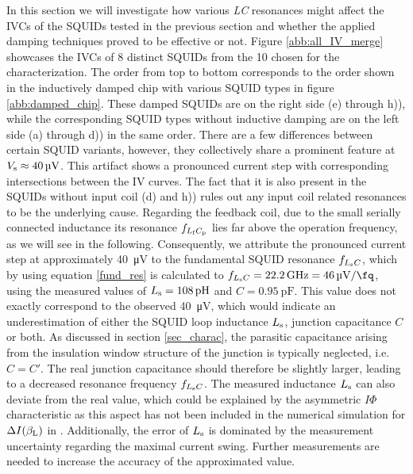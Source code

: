In this section we will investigate how various \textit{LC} resonances might affect the IVCs of the SQUIDs tested in the previous section and whether the applied damping techniques proved to be effective or not. Figure \ref{abb:all_IV_merge} showcases the IVCs of 8 distinct SQUIDs from the 10 chosen for the characterization. The order from top to bottom corresponds to the order shown in the inductively damped chip with various SQUID types in figure \ref{abb:damped_chip}. These damped SQUIDs are on the right side (e) through h)), while the corresponding SQUID types without inductive damping are on the left side (a) through d)) in the same order. There are a few differences between certain SQUID variants, however, they collectively share a prominent feature at $V_{\rm s}\approx\qty{40}{\uV}$. This artifact shows a pronounced current step with corresponding intersections between the IV curves. The fact that it is also present in the SQUIDs without input coil (d) and h)) rules out any input coil related resonances to be the underlying cause. Regarding the feedback coil, due to the small serially connected inductance its resonance $f_{L_{\rm f}C_{\rm p}}$ lies far above the operation frequency, as we will see in the following. Consequently, we attribute the pronounced current step at approximately \qty{40}{\uV} to the fundamental SQUID resonance $f_{L_{\rm s}C}$, which by using equation \ref{fund_res} is calculated to $f_{L_{\rm s}C}=\qty{22.2}{\GHz}=\qty{46}{\uV\per\fq}$, using the measured values of $L_{\rm s}=\qty{108}{\pH}$ and $C=\qty{0.95}{\pF}$. This value does not exactly correspond to the observed \qty{40}{\uV}, which would indicate an underestimation of either the SQUID loop inductance $L_{\rm s}$, junction capacitance $C$ or both. As discussed in section \ref{sec_charac}, the parasitic capacitance arising from the insulation window structure of the junction is typically neglected, i.e. $C=C'$. The real junction capacitance should therefore be slightly larger, leading to a decreased resonance frequency $f_{L_{\rm s}C}$. The measured inductance $L_{\rm s}$ can also deviate from the real value, which could be explained by the asymmetric $I\Phi$ characteristic as this aspect has not been included in the numerical simulation for $\Delta I(\beta_{\rm L})$ in \cite{Tesche1977}. Additionally, the error of $L_{\rm s}$ is dominated by the measurement uncertainty regarding the maximal current swing. Further measurements are needed to increase the accuracy of the approximated value.\\


